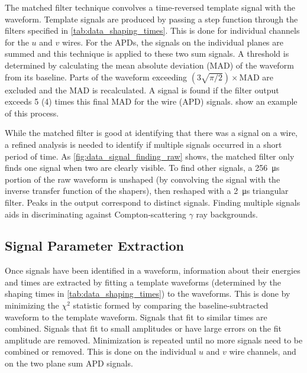 \documentclass[herrin-thesis.tex]{subfiles}
\begin{document}
The matched filter technique\cite{North:1963fk} convolves a time-reversed template signal with the waveform. Template signals are produced by passing a step function through the filters specified in \cref{tab:data_shaping_times}. This is done for individual channels for the \(u\) and \(v\) wires. For the APDs, the signals on the individual planes are summed and this technique is applied to these two sum signals. A threshold is determined by calculating the mean absolute deviation (MAD) of the waveform from its baseline. Parts of the waveform exceeding \((3\sqrt{\pi/2})\times\text{MAD}\) are excluded and the MAD is recalculated. A signal is found if the filter output exceeds 5 (4) times this final MAD for the wire (APD) signals.  show an example of this process.

While the matched filter is good at identifying that there was a signal on a wire, a refined analysis is needed to identify if multiple signals occurred in a short period of time. As \cref{fig:data_signal_finding_raw} shows, the matched filter only finds one signal when two are clearly visible. To find other signals, a \SI{256}{\micro\s} portion of the raw waveform is unshaped (by convolving the signal with the inverse transfer function of the shapers), then reshaped with a \SI{2}{\micro\s} triangular filter. Peaks in the output correspond to distinct signals. Finding multiple signals aids in discriminating against Compton-scattering \(\gamma\) ray backgrounds.

\subsection{Signal Parameter Extraction}
Once signals have been identified in a waveform, information about their energies and times are extracted by fitting a template waveforms (determined by the shaping times in \cref{tab:data_shaping_times}) to the waveforms. This is done by minimizing the \(\chi^2\) statistic formed by comparing the baseline-subtracted waveform to the template waveform. Signals that fit to similar times are combined. Signals that fit to small amplitudes or have large errors on the fit amplitude are removed. Minimization is repeated until no more signals need to be combined or removed. This is done on the individual \(u\) and \(v\) wire channels, and on the two plane sum APD signals.
\end{document}
